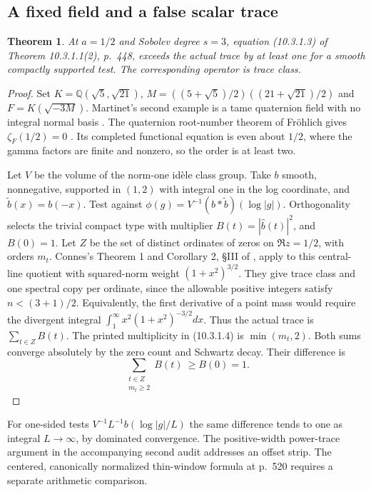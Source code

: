 \documentclass[11pt,reqno]{amsart}
\newtheorem{theorem}{Theorem}[section]
\numberwithin{equation}{section}
\newcommand{\Q}{\mathbb Q}\newcommand{\R}{\mathbb R}\newcommand{\C}{\mathbb C}\newcommand{\Z}{\mathbb Z}
\begin{document}
\subsection{A fixed field and a false scalar trace}\label{sec:central}
\begin{theorem}
At \(a=1/2\) and Sobolev degree \(s=3\), equation (10.3.1.3) of Theorem 10.3.1.1(2), p.~448, exceeds the actual trace by at least one for a smooth compactly supported test. The corresponding operator is trace class.
\end{theorem}
\begin{proof}
Set \(K=\Q(\sqrt5,\sqrt{21})\),
\(M=((5+\sqrt5)/2)((21+\sqrt{21})/2)\) and \(F=K(\sqrt{-3M})\).
Martinet's second example is a tame quaternion field with no integral normal basis \cite{martinet}. The quaternion root-number theorem of Fr\"ohlich gives \(\zeta_F(1/2)=0\) \cite{root}. Its completed functional equation is even about \(1/2\), where the gamma factors are finite and nonzero, so the order is at least two.

Let \(V\) be the volume of the norm-one id\`ele class group. Take \(b\) smooth, nonnegative, supported in \((1,2)\) with integral one in the log coordinate, and \(\widetilde b(x)=b(-x)\). Test against \(\phi(g)=V^{-1}(b*\widetilde b)(\log |g|)\). Orthogonality selects the trivial compact type with multiplier \(B(t)=|\widehat b(t)|^2\), and \(B(0)=1\). Let \(Z\) be the set of distinct ordinates of zeros on \(\Re z=1/2\), with orders \(m_t\).
Connes's Theorem 1 and Corollary 2, \S III of \cite{connes}, apply to this central-line quotient with squared-norm weight \((1+x^2)^{3/2}\). They give trace class and one spectral copy per ordinate, since the allowable positive integers satisfy \(n<(3+1)/2\). Equivalently, the first derivative of a point mass would require the divergent integral \(\int_1^\infty x^2(1+x^2)^{-3/2}dx\).
Thus the actual trace is \(\sum_{t\in Z} B(t)\). The printed multiplicity in (10.3.1.4) is \(\min(m_t,2)\). Both sums converge absolutely by the zero count and Schwartz decay. Their difference is
\[
  \sum_{\substack{t\in Z\\ m_t\ge 2}} B(t) \ \ge B(0)=1 .
\]
\end{proof}
For one-sided tests \(V^{-1}L^{-1}b(\log|g|/L)\) the same difference tends to one as integral \(L\to\infty\), by dominated convergence. The positive-width power-trace argument in the accompanying second audit addresses an offset strip. The centered, canonically normalized thin-window formula at p.~520 requires a separate arithmetic comparison.
\end{document}

